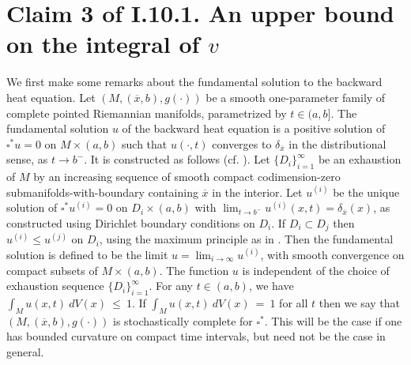 \documentclass[12pt]{amsart}
\newcommand{\ra}{\rightarrow}
\numberwithin{equation}{section}
\theoremstyle{plain}
\theoremstyle{definition}
\theoremstyle{remark}
\begin{document}
\section{Claim 3 of I.10.1. An upper bound on the integral of $v$} \label{Claim3}

We first make some remarks about the fundamental solution to the
backward heat equation. Let $(M, (\overline{x}, b), g(\cdot))$ be a smooth 
one-parameter family of complete pointed Riemannian manifolds,
parametrized by $t \in (a,b]$. The fundamental solution 
$u$ of the backward heat equation is a positive solution of
$\square^* u = 0$ on $M \times  (a,b)$ 
such that 
$ u(\cdot, t)$ converges  to $\delta_{\overline{x}}$ 
in the distributional sense,  as $t\ra b^-$.
It is constructed as follows (cf. \cite[Section 3]{Dodziuk}).
Let $\{ D_i \}_{i=1}^\infty$ be an exhaustion of $M$ by
an increasing sequence of smooth compact codimension-zero
submanifolds-with-boundary containing $\overline{x}$ in
the interior. Let $u^{(i)}$ be the unique solution of
$\square^* u^{(i)} = 0$ on $D_i \times (a,b)$ with 
$\lim_{t \rightarrow b^-} u^{(i)}(x, t) = \delta_{\overline{x}}(x)$,
as constructed using Dirichlet boundary conditions on $D_i$.
If $D_i \subset D_j$ then $u^{(i)} \le u^{(j)}$ on $D_i$,
using the maximum principle as in \cite[Lemma 3.1]{Dodziuk}.
Then the fundamental solution  is defined to be the limit 
$u=\lim_{i \rightarrow \infty} u^{(i)}$, with smooth  convergence
 on compact subsets of $M \times  (a,b)$.
 The function $u$ is
independent of the choice of exhaustion sequence $\{D_i\}_{i=1}^\infty$.
For any $t \in (a,b)$, we have $\int_M u(x,t) \: dV(x) \: \le \: 1$.
If $\int_M u(x,t) \: dV(x) \: = \: 1$ for all $t$ then 
we say that $(M, (\overline{x}, b), g(\cdot))$ is stochastically complete
for $\square^*$.
This will be the case if one has
bounded curvature on compact time intervals, but need not be the case in
general. 
\end{document}
